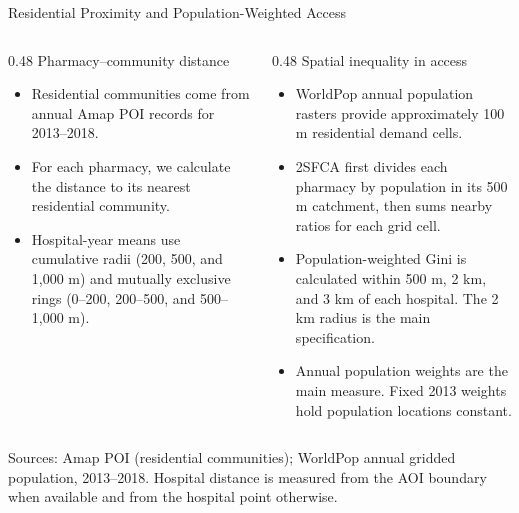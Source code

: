 \documentclass[aspectratio=169,11pt]{beamer}
\begin{document}
\begin{frame}{Residential Proximity and Population-Weighted Access}
\footnotesize
\begin{columns}[T,onlytextwidth]
  \begin{column}{0.48\textwidth}
    {\color{AcademicBlue}\normalsize Pharmacy--community distance}\par\vspace{0.35em}
    \begin{itemize}\setlength\itemsep{0.4em}
      \item Residential communities come from annual Amap POI records for 2013--2018.
      \item For each pharmacy, we calculate the distance to its nearest residential community.
      \item Hospital-year means use cumulative radii (200, 500, and 1,000 m) and mutually exclusive rings (0--200, 200--500, and 500--1,000 m).
    \end{itemize}
  \end{column}
  \begin{column}{0.48\textwidth}
    {\color{AcademicBlue}\normalsize Spatial inequality in access}\par\vspace{0.35em}
    \begin{itemize}\setlength\itemsep{0.4em}
      \item WorldPop annual population rasters provide approximately 100 m residential demand cells.
      \item 2SFCA first divides each pharmacy by population in its 500 m catchment, then sums nearby ratios for each grid cell.
      \item Population-weighted Gini is calculated within 500 m, 2 km, and 3 km of each hospital. The 2 km radius is the main specification.
      \item Annual population weights are the main measure. Fixed 2013 weights hold population locations constant.
    \end{itemize}
  \end{column}
\end{columns}
\vfill
\tiny Sources: Amap POI (residential communities); WorldPop annual gridded population, 2013--2018. Hospital distance is measured from the AOI boundary when available and from the hospital point otherwise.
\end{frame}
\end{document}
